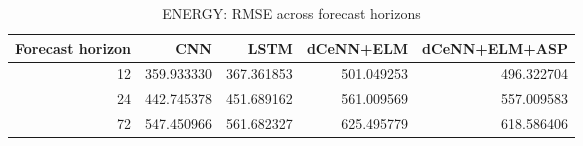 \begin{table}
\caption{ENERGY: RMSE across forecast horizons}
\begin{tabular}{rrrrr}
\toprule
Forecast horizon & CNN & LSTM & dCeNN+ELM & dCeNN+ELM+ASP \\
\midrule
12 & 359.933330 & 367.361853 & 501.049253 & 496.322704 \\
24 & 442.745378 & 451.689162 & 561.009569 & 557.009583 \\
72 & 547.450966 & 561.682327 & 625.495779 & 618.586406 \\
\bottomrule
\end{tabular}
\end{table}
